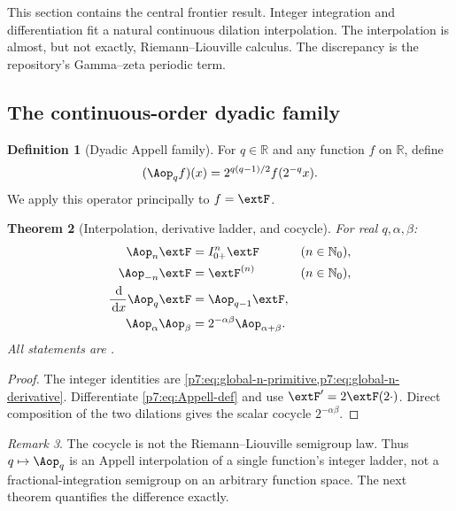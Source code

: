 \documentclass[11pt,oneside]{article}
\newtheorem{theorem}{Theorem}[section]
\theoremstyle{definition}
\newtheorem{definition}[theorem]{Definition}
\theoremstyle{remark}
\newtheorem{remark}[theorem]{Remark}
\newcommand{\R}{\mathbb R}
\newcommand{\N}{\mathbb N}
\newcommand{\dd}{\,\mathrm d}
\newcommand{\1}{\mathbf 1}
\begin{document}
This section contains the central frontier result.  Integer integration and differentiation
fit a natural continuous dilation interpolation.  The interpolation is almost, but not
exactly, Riemann--Liouville calculus.  The discrepancy is the repository's Gamma--zeta
periodic term.

\subsection{The continuous-order dyadic family}

\begin{definition}[Dyadic Appell family]
For $q\in\R$ and any function $f$ on $\R$, define
\begin{equation}
 (\Aop_q f)(x)=2^{q(q-1)/2}f(2^{-q}x).
 \label{p7:eq:Appell-def}
\end{equation}
We apply this operator principally to $f=\extF$.
\end{definition}

\begin{theorem}[Interpolation, derivative ladder, and cocycle]
\label{p7:thm:Appell-structure}
For real $q,\alpha,\beta$:
\begin{align}
 \Aop_n\extF&=I_{0+}^{n}\extF &&(n\in\N_0),
 \label{p7:eq:Appell-positive-integers}\\
 \Aop_{-n}\extF&=\extF^{(n)} &&(n\in\N_0),
 \label{p7:eq:Appell-negative-integers}\\
 \frac{\dd}{\dd x}\Aop_q\extF&=\Aop_{q-1}\extF,
 \label{p7:eq:Appell-derivative}\\
 \Aop_\alpha\Aop_\beta&=2^{-\alpha\beta}\Aop_{\alpha+\beta}.
 \label{p7:eq:Appell-cocycle}
\end{align}
All statements are \statusproved.
\end{theorem}

\begin{proof}
The integer identities are \cref{p7:eq:global-n-primitive,p7:eq:global-n-derivative}.  Differentiate
\cref{p7:eq:Appell-def} and use $\extF'=2\extF(2\cdot)$.  Direct composition of the two dilations
gives the scalar cocycle $2^{-\alpha\beta}$.
\end{proof}

\begin{remark}
The cocycle is not the Riemann--Liouville semigroup law.  Thus $q\mapsto\Aop_q$ is an Appell
interpolation of a single function's integer ladder, not a fractional-integration semigroup on
an arbitrary function space.  The next theorem quantifies the difference exactly.
\end{remark}
\end{document}
